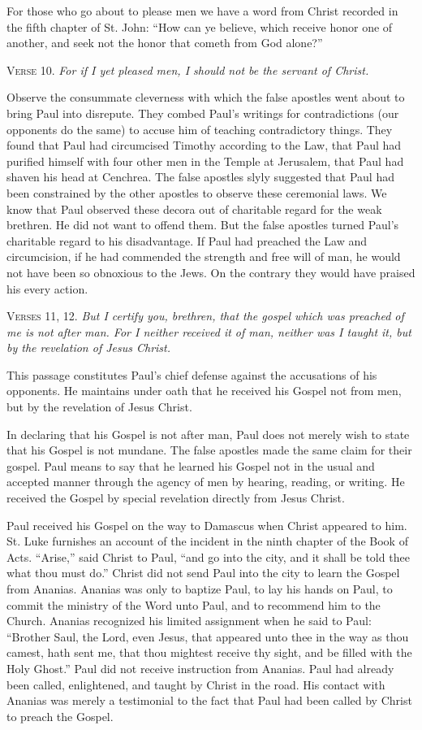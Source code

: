 For those who go about to please men we have a word from Christ recorded in the fifth chapter of St. John: “How can ye believe, which receive honor one of another, and seek not the honor that cometh from God alone?”

\textsc{Verse} 10. \emph{For if I yet pleased men, I should not be the servant of Christ.}

Observe the consummate cleverness with which the false apostles went about to bring Paul into disrepute. They combed Paul’s writings for contradictions (our opponents do the same) to accuse him of teaching contradictory things. They found that Paul had circumcised Timothy according to the Law, that Paul had purified himself with four other men in the Temple at Jerusalem, that Paul had shaven his head at Cenchrea. The false apostles slyly suggested that Paul had been constrained by the other apostles to observe these ceremonial laws. We know that Paul observed these decora out of charitable regard for the weak brethren. He did not want to offend them. But the false apostles turned Paul’s charitable regard to his disadvantage. If Paul had preached the Law and circumcision, if he had commended the strength and free will of man, he would not have been so obnoxious to the Jews. On the contrary they would have praised his every action.

\textsc{Verses} 11, 12. \emph{But I certify you, brethren, that the gospel which was preached of me is not after man. For I neither received it of man, neither was I taught it, but by the revelation of Jesus Christ.}

This passage constitutes Paul’s chief defense against the accusations of his opponents. He maintains under oath that he received his Gospel not from men, but by the revelation of Jesus Christ.

In declaring that his Gospel is not after man, Paul does not merely wish to state that his Gospel is not mundane. The false apostles made the same claim for their gospel. Paul means to say that he learned his Gospel not in the usual and accepted manner through the agency of men by hearing, reading, or writing. He received the Gospel by special revelation directly from Jesus Christ.

Paul received his Gospel on the way to Damascus when Christ appeared to him. St. Luke furnishes an account of the incident in the ninth chapter of the Book of Acts. “Arise,” said Christ to Paul, “and go into the city, and it shall be told thee what thou must do.” Christ did not send Paul into the city to learn the Gospel from Ananias. Ananias was only to baptize Paul, to lay his hands on Paul, to commit the ministry of the Word unto Paul, and to recommend him to the Church. Ananias recognized his limited assignment when he said to Paul: “Brother Saul, the Lord, even Jesus, that appeared unto thee in the way as thou camest, hath sent me, that thou mightest receive thy sight, and be filled with the Holy Ghost.” Paul did not receive instruction from Ananias. Paul had already been called, enlightened, and taught by Christ in the road. His contact with Ananias was merely a testimonial to the fact that Paul had been called by Christ to preach the Gospel.


